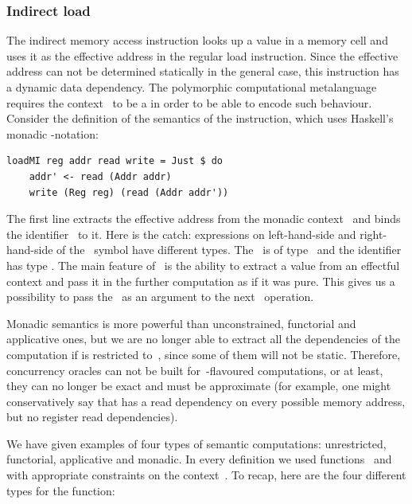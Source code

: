 \subsubsection{Indirect load}

The indirect memory access instruction looks up a value in a memory cell and uses
it as the effective address in the regular load instruction. Since the effective
address can not be determined statically in the general case, this instruction
has a dynamic data dependency. The polymorphic computational metalanguage requires
the context~ to be a  in order to be able to encode such behaviour.
Consider the definition of the semantics of the  instruction, which
uses Haskell's monadic -notation:

\begin{verbatim}
loadMI reg addr read write = Just $ do
    addr' <- read (Addr addr)
    write (Reg reg) (read (Addr addr'))
\end{verbatim}

\noindent
The first line extracts the effective address from the monadic context~
and binds the identifier~ to it. Here is the catch: expressions
on left-hand-side and right-hand-side of the~\hs{<-} symbol have different types.
The~ is of type~ and the
identifier~ has type . The main feature of~ is the
ability to extract a value from an effectful context and pass it in the further
computation as if it was pure. This gives us a possibility to pass the~
as an argument to the next~ operation.

Monadic semantics is more powerful than unconstrained, functorial and applicative ones,
but we are no longer able to extract all the dependencies of the computation if
 is restricted to~, since some of them will not be static.
Therefore, concurrency oracles can not be built for~-flavoured
computations, or at least, they can no longer be exact and must be approximate
(for example, one might conservatively say that  has a read
dependency on every possible memory address, but no register read dependencies).

We have given examples of four types of semantic computations: unrestricted,
functorial, applicative and monadic. In every definition we used
functions~ and~ with appropriate constraints on the
context~. To recap, here are the four different types for the 
function:

